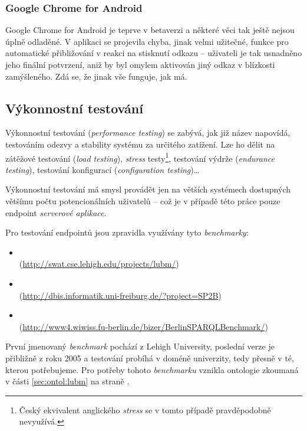 \subsubsection*{Google Chrome for Android}
Google Chrome for Android je teprve v betaverzi a některé věci tak ještě nejsou úplně odladěné. V aplikaci se projevila chyba, jinak velmi užitečné, funkce pro automatické přibližování v reakci na stisknutí odkazu -- uživateli je tak usnadněno jeho finální potvrzení, aniž by byl omylem aktivován jiný odkaz v blízkosti zamýšleného. Zdá se, že jinak vše funguje, jak má.


\subsection{Výkonnostní testování}
Výkonnostní testování (\textit{performance testing}) se zabývá, jak již název napovídá, testováním odezvy a stability systému za určitého zatížení. Lze ho dělit na zátěžové testování (\textit{load testing}), \textit{stress} testy\footnote{Český ekvivalent anglického \textit{stress} se v tomto případě pravděpodobně nevyužívá.}, testování výdrže (\textit{endurance testing}), testování konfigurací (\textit{configuration testing})\dots

Výkonnostní testování má smysl provádět jen na větších systémech dostupných většímu počtu potencionálních uživatelů -- což je v případě této práce pouze  endpoint \textit{serverové aplikace}.

Pro testování  endpointů jsou zpravidla využívány tyto \textit{benchmarky}:

\begin{itemize}
 \item {}\\ (\url{http://swat.cse.lehigh.edu/projects/lubm/})
 \item {}\\ (\url{http://dbis.informatik.uni-freiburg.de/?project=SP2B})
 \item {}\\ (\url{http://www4.wiwiss.fu-berlin.de/bizer/BerlinSPARQLBenchmark/})
\end{itemize}

První jmenovaný \textit{benchmark} pochází z Lehigh University, poslední verze je přibližně z roku 2005 a testování probíhá v doméně univerzity, tedy přesně v té, kterou potřebujeme. Pro potřeby tohoto \textit{benchmarku} vznikla ontologie zkoumaná v části \ref{sec:ontol:lubm} na straně \pageref{sec:ontol:lubm}.

